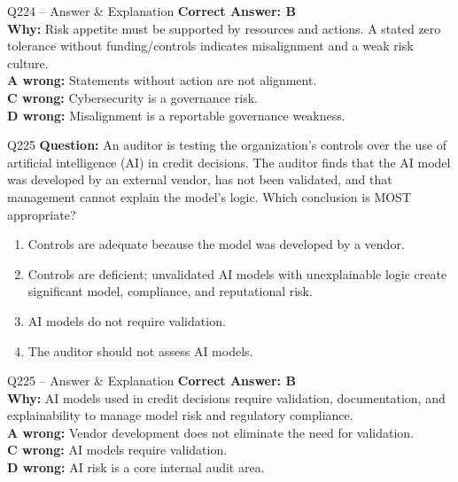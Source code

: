 \documentclass[aspectratio=169,10pt]{beamer}
\begin{document}
	\begin{frame}[t]{Q224 -- Answer \& Explanation}
		\small
		\textbf{Correct Answer: B} \\[4pt]
		\textbf{Why:} Risk appetite must be supported by resources and actions. A stated zero tolerance without funding/controls indicates misalignment and a weak risk culture. \\[4pt]
		\textbf{A wrong:} Statements without action are not alignment. \\[2pt]
		\textbf{C wrong:} Cybersecurity is a governance risk. \\[2pt]
		\textbf{D wrong:} Misalignment is a reportable governance weakness.
	\end{frame}
	
	\begin{frame}[t]{Q225}
		\small
		\textbf{Question:} An auditor is testing the organization's controls over the use of artificial intelligence (AI) in credit decisions. The auditor finds that the AI model was developed by an external vendor, has not been validated, and that management cannot explain the model's logic. Which conclusion is MOST appropriate?
		\begin{enumerate}[label=\Alph*.,itemsep=1pt,topsep=2pt]
			\item Controls are adequate because the model was developed by a vendor.
			\item Controls are deficient; unvalidated AI models with unexplainable logic create significant model, compliance, and reputational risk.
			\item AI models do not require validation.
			\item The auditor should not assess AI models.
		\end{enumerate}
	\end{frame}
	
	\begin{frame}[t]{Q225 -- Answer \& Explanation}
		\small
		\textbf{Correct Answer: B} \\[4pt]
		\textbf{Why:} AI models used in credit decisions require validation, documentation, and explainability to manage model risk and regulatory compliance. \\[4pt]
		\textbf{A wrong:} Vendor development does not eliminate the need for validation. \\[2pt]
		\textbf{C wrong:} AI models require validation. \\[2pt]
		\textbf{D wrong:} AI risk is a core internal audit area.
	\end{frame}
	
\end{document}
